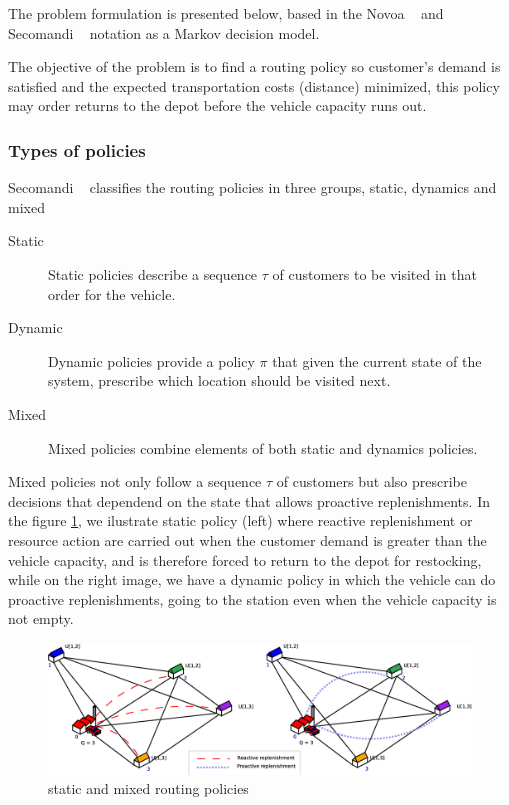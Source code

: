 The problem formulation is presented below, based in the Novoa ~\cite{novoa_approximate_2009} and Secomandi ~\cite{secomandi_rollout_2001} notation as a Markov decision model.

The objective of the problem is to find a routing policy so customer's demand is satisfied and the expected transportation costs (distance) minimized, this policy may order returns to the depot before the vehicle capacity runs out.

\subsubsection{Types of policies}

Secomandi ~\cite{secomandi_comparing_2000} classifies the routing policies in three groups, static, dynamics and mixed

\begin{description}
  \item[Static] Static policies describe a sequence $\tau$ of customers to be visited in that order for the vehicle.
  \item[Dynamic] Dynamic policies provide a policy $\pi$ that given the current state of the system, prescribe which location should be visited next.
  \item[Mixed] Mixed policies combine elements of both static and dynamics policies.
\end{description}

Mixed policies not only follow a sequence $\tau$ of customers but also prescribe decisions that dependend on the state that allows proactive replenishments. In the figure \ref{fig:routing_policies}, we ilustrate static policy (left) where reactive replenishment or resource action are carried out when the customer demand is greater than the vehicle capacity, and  is therefore forced to return to the depot for restocking, while on the right image, we have a dynamic policy in which the vehicle can do proactive replenishments, going to the station even when the vehicle capacity is not empty.

\begin{figure}[!htbp]
  \begin{center}
   \includegraphics[width=1\textwidth]{Images/Chapter2/exIns4a.eps}
  \end{center}
    \caption{static and mixed routing policies}\label{fig:routing_policies}
\end{figure}

